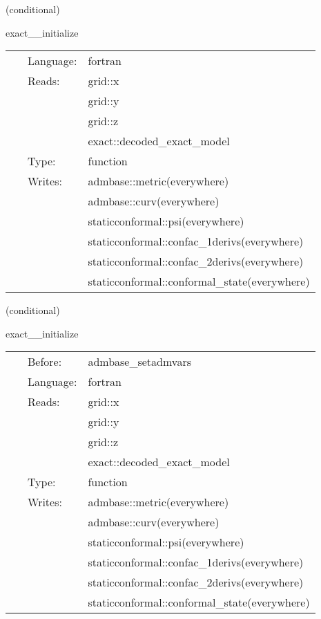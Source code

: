 \vspace{5mm}

   (conditional) 

\hspace{5mm} exact\_\_initialize 

\hspace{5mm}{\it set data from exact solution on an exact slice } 


\hspace{5mm}

 \begin{tabular*}{160mm}{cll} 
~ & Language:  & fortran \\ 
~ & Reads:  & grid::x \\ 
~& ~ &grid::y\\ 
~& ~ &grid::z\\ 
~& ~ &exact::decoded\_exact\_model\\ 
~ & Type:  & function \\ 
~ & Writes:  & admbase::metric(everywhere) \\ 
~& ~ &admbase::curv(everywhere)\\ 
~& ~ &staticconformal::psi(everywhere)\\ 
~& ~ &staticconformal::confac\_1derivs(everywhere)\\ 
~& ~ &staticconformal::confac\_2derivs(everywhere)\\ 
~& ~ &staticconformal::conformal\_state(everywhere)\\ 
\end{tabular*} 


\vspace{5mm}

   (conditional) 

\hspace{5mm} exact\_\_initialize 

\hspace{5mm}{\it set data from exact solution on an exact slice } 


\hspace{5mm}

 \begin{tabular*}{160mm}{cll} 
~ & Before:  & admbase\_setadmvars \\ 
~ & Language:  & fortran \\ 
~ & Reads:  & grid::x \\ 
~& ~ &grid::y\\ 
~& ~ &grid::z\\ 
~& ~ &exact::decoded\_exact\_model\\ 
~ & Type:  & function \\ 
~ & Writes:  & admbase::metric(everywhere) \\ 
~& ~ &admbase::curv(everywhere)\\ 
~& ~ &staticconformal::psi(everywhere)\\ 
~& ~ &staticconformal::confac\_1derivs(everywhere)\\ 
~& ~ &staticconformal::confac\_2derivs(everywhere)\\ 
~& ~ &staticconformal::conformal\_state(everywhere)\\ 
\end{tabular*} 


